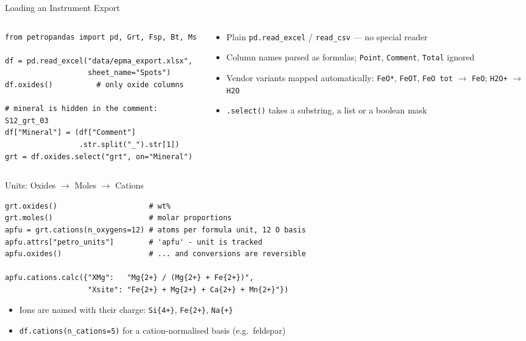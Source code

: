 \documentclass[aspectratio=169,11pt]{beamer}
\begin{document}
\begin{frame}[fragile]{Loading an Instrument Export}
  \begin{columns}[T]
    \begin{column}{0.55\textwidth}
      \begin{lstlisting}[style=python]
from petropandas import pd, Grt, Fsp, Bt, Ms

df = pd.read_excel("data/epma_export.xlsx",
                   sheet_name="Spots")
df.oxides()          # only oxide columns

# mineral is hidden in the comment: S12_grt_03
df["Mineral"] = (df["Comment"]
                 .str.split("_").str[1])
grt = df.oxides.select("grt", on="Mineral")
      \end{lstlisting}
    \end{column}
    \begin{column}{0.42\textwidth}
      \small
      \begin{itemize}
        \item Plain \texttt{pd.read\_excel} / \texttt{read\_csv} --- no special reader
        \item Column names parsed as formulas; \texttt{Point}, \texttt{Comment}, \texttt{Total} ignored
        \item Vendor variants mapped automatically: \texttt{FeO*}, \texttt{FeOT}, \texttt{FeO tot} $\rightarrow$ \texttt{FeO}; \texttt{H2O+} $\rightarrow$ \texttt{H2O}
        \item \texttt{.select()} takes a substring, a list or a boolean mask
      \end{itemize}
    \end{column}
  \end{columns}
\end{frame}

\begin{frame}[fragile]{Units: Oxides $\rightarrow$ Moles $\rightarrow$ Cations}
  \begin{lstlisting}[style=python]
grt.oxides()                     # wt%
grt.moles()                      # molar proportions
apfu = grt.cations(n_oxygens=12) # atoms per formula unit, 12 O basis
apfu.attrs["petro_units"]        # 'apfu' - unit is tracked
apfu.oxides()                    # ... and conversions are reversible

apfu.cations.calc({"XMg":   "Mg{2+} / (Mg{2+} + Fe{2+})",
                   "Xsite": "Fe{2+} + Mg{2+} + Ca{2+} + Mn{2+}"})
  \end{lstlisting}
  \vspace{0.2cm}
  \small
  \begin{itemize}
    \item Ions are named with their charge: \texttt{Si\{4+\}}, \texttt{Fe\{2+\}}, \texttt{Na\{+\}}
    \item \texttt{df.cations(n\_cations=5)} for a cation-normalised basis (e.g.\ feldspar)
  \end{itemize}
\end{frame}
\end{document}
